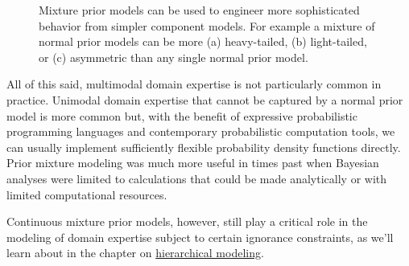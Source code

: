 \documentclass[
  letterpaper,
  DIV=11,
  numbers=noendperiod]{scrartcl}
\begin{document}
\begin{figure}
\begin{minipage}{0.33\linewidth}
\end{minipage}%
%
\begin{minipage}{0.33\linewidth}


\subcaption{\label{fig-asymmetric}}

\end{minipage}%

\caption{\label{fig-mixture-priors}Mixture prior models can be used to
engineer more sophisticated behavior from simpler component models. For
example a mixture of normal prior models can be more (a) heavy-tailed,
(b) light-tailed, or (c) asymmetric than any single normal prior model.}

\end{figure}%

All of this said, multimodal domain expertise is not particularly common
in practice. Unimodal domain expertise that cannot be captured by a
normal prior model is more common but, with the benefit of expressive
probabilistic programming languages and contemporary probabilistic
computation tools, we can usually implement sufficiently flexible
probability density functions directly. Prior mixture modeling was much
more useful in times past when Bayesian analyses were limited to
calculations that could be made analytically or with limited
computational resources.

Continuous mixture prior models, however, still play a critical role in
the modeling of domain expertise subject to certain ignorance
constraints, as we'll learn about in the chapter on
\href{https://betanalpha.github.io/assets/case_studies/hierarchical_modeling.html}{hierarchical
modeling}.
\end{document}
